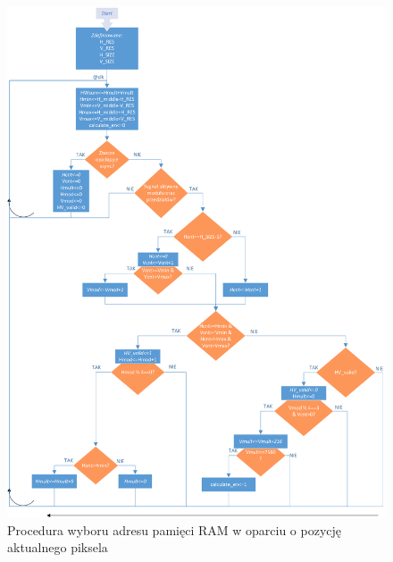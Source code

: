 \begin{figure}[]
	\centering
	\includegraphics[width=16cm]{4_HOG_Histograms.png}
	\caption{Procedura wyboru adresu pamięci RAM w oparciu o pozycję aktualnego piksela}
	\label{fig:hog_histogram_scheme}
\end{figure} 
 
